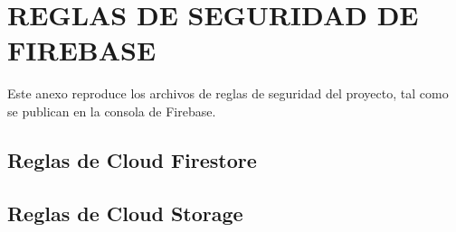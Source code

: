 \chapter{REGLAS DE SEGURIDAD DE FIREBASE}
\label{anx:reglas}

Este anexo reproduce los archivos de reglas de seguridad del proyecto, tal
como se publican en la consola de Firebase.

\section{Reglas de Cloud Firestore}



\section{Reglas de Cloud Storage}



